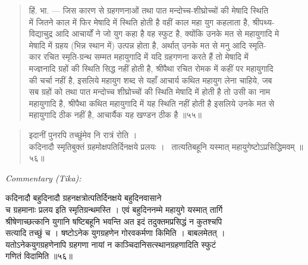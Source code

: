 \documentclass[11pt,a4paper]{article}
\newcommand{\skt}[1]{{\devanagarifont\color{sktcolor} #1}}
\newenvironment{shloka}{%
  \begin{quote}%
  \smallskip%
  \devanagarifont\color{sktcolor}%
}{%
  \smallskip%
  \end{quote}%
}
\newenvironment{tika}{%
  \smallskip%
  \noindent\textit{Commentary (Tika):}\par%
  \smallskip%
  \hindifont\small%
}{%
  \par\smallskip%
}
\begin{document}
\begin{shloka}
\skt{हिं. भा. — जिस कारण से ग्रहगणनाओं तथा पात मन्दोच्च-शीघ्रोच्चों की मेषादि स्थिति}\\
\skt{में जितने काल में फिर मेषादि में स्थिति होती है वहीं काल महा युग कहलाता है, श्रीपथ्य-}\\
\skt{विद्याचुद्र आदि आचार्यों ने जो युग कहा है वह स्फुट है, क्योंकि उनके मत से महायुगादि मे}\\
\skt{मेषादि में ग्रहय (भिन्न स्थान में) उत्पन्न होता है, अर्थात् उनके मत से मनु आदि स्मृति-}\\
\skt{कार रचित स्मृति-ग्रन्थ सम्मत महायुगादि में यदि ग्रहगणना करते हैं तो मेषादि में}\\
\skt{मज्ज्ञनादि ग्रहों की स्थिति सिद्ध नहीं होती है, श्रीपैथा रचित रोमक में कहीं पर महायुगादि}\\
\skt{की चर्चा नहीं है, इसलिये महायुग शब्द से यहाँ आचार्य कथित महायुग लेना चाहिये, जब}\\
\skt{सब ग्रहों को तथा पात मन्दोच्च शीघ्रोच्चों की स्थिति मेषादि में होती है तो उसी का नाम}\\
\skt{महायुगादि है, श्रीपैथा कथित महायुगादि में यह स्थिति नहीं होती है इसलिये उनके मत से}\\
\skt{महायुगादि ठीक नहीं है, आचार्यैक यह खण्डन ठीक है} ॥५५॥
\end{shloka}

\vspace{0.5cm}

\begin{shloka}
\skt{इदानीं पुनरपि तच्छुंमेव नि रात्रं रोति ।}\\[0.5em]
\skt{कदिनादौ स्मृतिबुक्तं ग्रहमोक्षपतिर्दिनक्षये प्रलयः ।}\
\skt{तात्यतिबहूनि यस्मात् महायुगेष्टोऽप्रसिद्धिमवम्} ॥५६॥
\end{shloka}

\vspace{0.3cm}
\begin{tika}
\skt{कदिनादौ बहुदिनादौ ग्रहनक्षत्रोत्पतिर्दिनक्षये बहुदिनवासाने}\\
\skt{च ग्रहमानाः प्रलय इति स्मृतिग्रन्थमस्ति । एवं बहुदिननम्मे महायुगे यस्मात् तार्गि}\\
\skt{श्रीषेणाच्छत्कानि युगानि षष्टिबहूनि भवन्ति अत इदं तदुक्तमप्रसिद्धं न कुतश्चपि}\\
\skt{सत्यादि तच्छुं च । षष्टोऽनेक युगग्रहणेन गोरवकर्मणा किमिति । बाबलमेतत् ।}\\
\skt{यतोऽनेकयुगग्रहणेनापि ग्रहगणा नायां न काञ्चिदानिसत्स्थानग्रहणादिति स्फुटं}\\
\skt{गणितं विदामिति} ॥५६॥
\end{tika}
\end{document}
